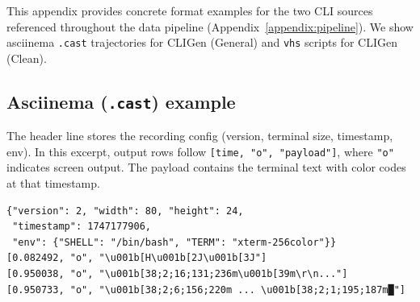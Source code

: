 \noindent This appendix provides concrete format examples for the two CLI sources referenced throughout the data pipeline (Appendix~\ref{appendix:pipeline}).
We show asciinema \texttt{.cast} trajectories for CLIGen (General) and \texttt{vhs} scripts for CLIGen (Clean).
\subsection{Asciinema (\texttt{.cast}) example}
\label{appendix:cast-format}
The header line stores the recording config (version, terminal size, timestamp, env).
In this excerpt, output rows follow \texttt{[time, "o", "payload"]}, where \texttt{"o"} indicates screen output.
The payload contains the terminal text with color codes at that timestamp.
\begin{verbatim}
{"version": 2, "width": 80, "height": 24,
 "timestamp": 1747177906,
 "env": {"SHELL": "/bin/bash", "TERM": "xterm-256color"}}
[0.082492, "o", "\u001b[H\u001b[2J\u001b[3J"]
[0.950038, "o", "\u001b[38;2;16;131;236m\u001b[39m\r\n..."]
[0.950733, "o", "\u001b[38;2;6;156;220m ... \u001b[38;2;1;195;187m█"]
\end{verbatim}

